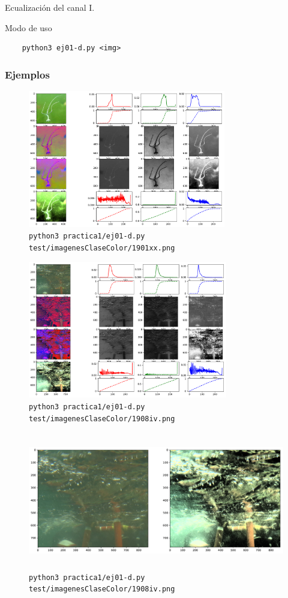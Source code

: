 \documentclass[11pt, spanish]{article}
\begin{document}
Ecualización del canal I.

Modo de uso
\begin{verbatim}
    python3 ej01-d.py <img>
\end{verbatim}

\subsubsection*{Ejemplos}
\begin{figure}[H]
\centering
  \includegraphics[height=6cm]{informe-imgs/ej01-d-1.pdf}
  \caption{\texttt{python3 practica1/ej01-d.py test/imagenesClaseColor/1901xx.png}}
\end{figure}
\begin{figure}[H]
\centering
  \includegraphics[height=6cm]{informe-imgs/ej01-d-2.pdf}
  \caption{\texttt{python3 practica1/ej01-d.py test/imagenesClaseColor/1908iv.png}}
\end{figure}
\begin{figure}[H]
\centering
  \includegraphics[height=6cm]{informe-imgs/ej01-d-3.pdf}
  \caption{\texttt{python3 practica1/ej01-d.py test/imagenesClaseColor/1908iv.png}}
\end{figure}
\end{document}
